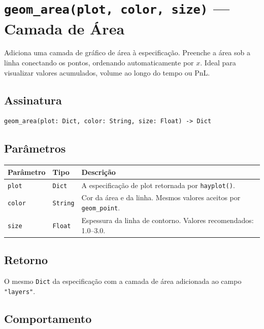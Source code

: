 \documentclass[12pt, a4paper, oneside]{book}
\newcommand{\code}[1]{\texttt{#1}}
\begin{document}
\section{\texttt{geom\_area(plot, color, size)} --- Camada de Área}

Adiciona uma camada de gráfico de área à especificação. Preenche a área sob a linha
conectando os pontos, ordenando automaticamente por $x$. Ideal para visualizar valores
acumulados, volume ao longo do tempo ou PnL.

\subsection*{Assinatura}

\begin{lstlisting}[style=inline]
geom_area(plot: Dict, color: String, size: Float) -> Dict
\end{lstlisting}

\subsection*{Parâmetros}

\begin{tabularx}{\textwidth}{@{}lL{2.5cm}X@{}}
  \toprule
  \textbf{Parâmetro} & \textbf{Tipo} & \textbf{Descrição} \\
  \midrule
  \code{plot}  & \code{Dict}   & A especificação de plot retornada por \code{hayplot()}. \\[4pt]
  \code{color} & \code{String} & Cor da área e da linha. Mesmos valores aceitos por \code{geom\_point}. \\[4pt]
  \code{size}  & \code{Float}  & Espessura da linha de contorno. Valores recomendados: 1.0--3.0. \\
  \bottomrule
\end{tabularx}

\subsection*{Retorno}

O mesmo \code{Dict} da especificação com a camada de área adicionada ao
campo \code{"layers"}.

\subsection*{Comportamento}
\end{document}
